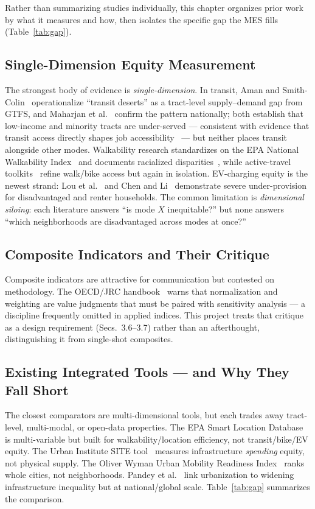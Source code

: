 \documentclass[11pt]{article}
\begin{document}
Rather than summarizing studies individually, this chapter organizes prior work
by what it measures and how, then isolates the specific gap the MES fills
(Table~\ref{tab:gap}).

\subsection{Single-Dimension Equity Measurement}
The strongest body of evidence is \emph{single-dimension}. In transit, Aman and
Smith-Colin~\cite{aman2020} operationalize ``transit deserts'' as a
tract-level supply--demand gap from GTFS, and Maharjan et al.~\cite{maharjan2024}
confirm the pattern nationally; both establish that low-income and minority
tracts are under-served --- consistent with evidence that transit access
directly shapes job accessibility~\cite{ermagun2020} --- but neither places
transit alongside other modes.
Walkability research standardizes on the EPA National Walkability
Index~\cite{epa2024} and documents racialized disparities~\cite{urban2022}, while
active-travel toolkits~\cite{albashir2024,sustrans2023} refine walk/bike access
but again in isolation. EV-charging equity is the newest strand: Lou et
al.~\cite{lou2025} and Chen and Li~\cite{chenli2024} demonstrate severe
under-provision for disadvantaged and renter households. The common limitation is
\emph{dimensional siloing}: each literature answers ``is mode $X$ inequitable?''
but none answers ``which neighborhoods are disadvantaged across modes at once?''

\subsection{Composite Indicators and Their Critique}
Composite indicators are attractive for communication but contested on
methodology. The OECD/JRC handbook~\cite{nardo2008} warns that normalization and
weighting are value judgments that must be paired with sensitivity analysis ---
a discipline frequently omitted in applied indices. This project treats that
critique as a design requirement (Secs.~3.6--3.7) rather than an afterthought,
distinguishing it from single-shot composites.

\subsection{Existing Integrated Tools --- and Why They Fall Short}
The closest comparators are multi-dimensional tools, but each trades away
tract-level, multi-modal, or open-data properties. The EPA Smart Location
Database is multi-variable but built for walkability/location efficiency, not
transit/bike/EV equity. The Urban Institute SITE tool~\cite{urbanSITE2025}
measures infrastructure \emph{spending} equity, not physical supply. The Oliver
Wyman Urban Mobility Readiness Index~\cite{oliverwyman2024} ranks whole cities,
not neighborhoods. Pandey et al.~\cite{pandey2025} link urbanization to widening
infrastructure inequality but at national/global scale. Table~\ref{tab:gap}
summarizes the comparison.
\end{document}
